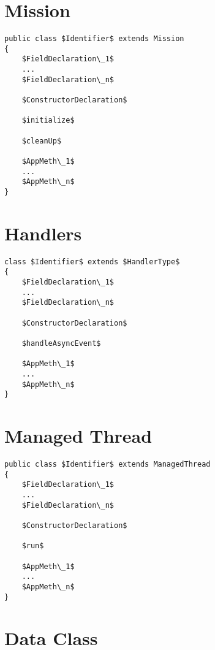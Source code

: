 \documentclass[11pt,a4paper]{article}
\begin{document}
\section*{Mission}

\begin{lstlisting}
public class $Identifier$ extends Mission
{
	$FieldDeclaration\_1$
	...
	$FieldDeclaration\_n$

	$ConstructorDeclaration$

	$initialize$

	$cleanUp$

	$AppMeth\_1$
	...
	$AppMeth\_n$
}
\end{lstlisting}

\newpage

\section*{Handlers}

\begin{lstlisting}
class $Identifier$ extends $HandlerType$
{
	$FieldDeclaration\_1$
	...
	$FieldDeclaration\_n$

	$ConstructorDeclaration$

	$handleAsyncEvent$

	$AppMeth\_1$
	...
	$AppMeth\_n$
}
\end{lstlisting}

\newpage

\section*{Managed Thread}

\begin{lstlisting}
public class $Identifier$ extends ManagedThread
{
	$FieldDeclaration\_1$
	...
	$FieldDeclaration\_n$

	$ConstructorDeclaration$

	$run$

	$AppMeth\_1$
	...
	$AppMeth\_n$
}
\end{lstlisting}


\section*{Data Class}


\end{document}
